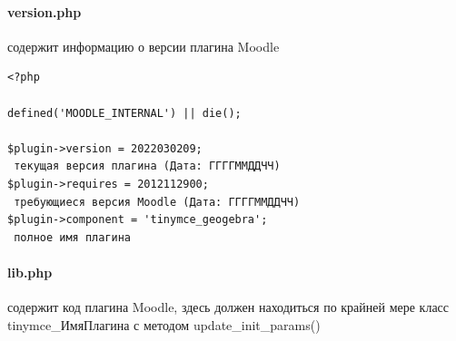 \documentclass[14pt,Diplom]{diplomwork}
\begin{document}
 \paragraph{version.php}
содержит информацию о версии плагина Moodle
\begin{Verbatim}
<?php

defined('MOODLE_INTERNAL') || die();

$plugin->version = 2022030209;
 текущая версия плагина (Дата: ГГГГММДДЧЧ)
$plugin->requires = 2012112900; 
 требующиеся версия Moodle (Дата: ГГГГММДДЧЧ)
$plugin->component = 'tinymce_geogebra'; 
 полное имя плагина
\end{Verbatim}

\paragraph{lib.php}
содержит код плагина Moodle, здесь должен находиться по крайней мере класс tinymce\_ИмяПлагина с методом update\_init\_params()\\


\end{document}

